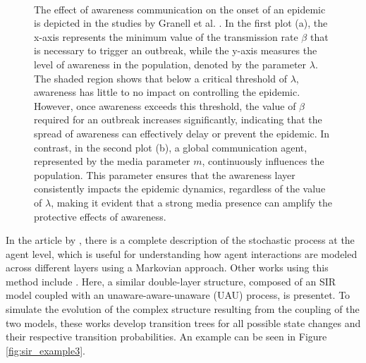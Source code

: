 \begin{figure}[]
	\centering
	 \quad
	 \\
	\caption[Metacritical effect]{The effect of awareness communication on the onset of an epidemic is depicted in the studies by Granell et al. \cite{Granell2013, Granell_2014}. In the first plot (a), the x-axis represents the minimum value of the transmission rate $\beta$ that is necessary to trigger an outbreak, while the y-axis measures the level of awareness in the population, denoted by the parameter $\lambda$. The shaded region shows that below a critical threshold of $\lambda$, awareness has little to no impact on controlling the epidemic. However, once awareness exceeds this threshold, the value of $\beta$ required for an outbreak increases significantly, indicating that the spread of awareness can effectively delay or prevent the epidemic. In contrast, in the second plot (b), a global communication agent, represented by the media parameter $m$, continuously influences the population. This parameter ensures that the awareness layer consistently impacts the epidemic dynamics, regardless of the value of $\lambda$, making it evident that a strong media presence can amplify the protective effects of awareness.}
	\label{fig:sir_example2}
\end{figure}


In the article by \cite{Sahneh2013}, there is a complete description of the stochastic process at the agent level, which is useful for understanding how agent interactions are modeled across different layers using a Markovian approach. Other works using this method include \cite{Silva2019, Peng2021, Zuo_2021}. Here, a similar double-layer structure, composed of an SIR model coupled with an unaware-aware-unaware (UAU) process, is presentet. To simulate the evolution of the complex structure resulting from the coupling of the two models, these works develop transition trees for all possible state changes and their respective transition probabilities. An example can be seen in Figure \ref{fig:sir_example3}.  

